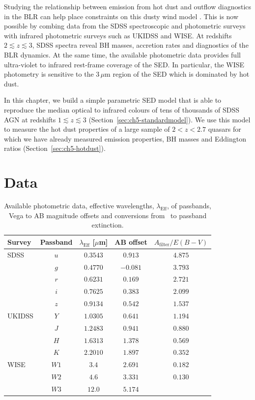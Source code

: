 Studying the relationship between emission from hot dust and outflow diagnostics in the BLR can help place constraints on this dusty wind model \citep[e.g.][]{wang13}. 
This is now possible by combing data from the SDSS spectroscopic and photometric surveys with infrared photometric surveys such as UKIDSS and WISE. 
At redshifts $2\lesssim z \lesssim3$, SDSS spectra reveal BH masses, accretion rates and diagnostics of the BLR dynamics. 
At the same time, the available photometric data provides full ultra-violet to infrared rest-frame coverage of the SED.
In particular, the WISE photometry is sensitive to the $3$\,$\mu$m region of the SED which is dominated by hot dust. 

In this chapter, we build a simple parametric SED model that is able to reproduce the median optical to infrared colours of tens of thousands of SDSS AGN at redshifts $1 \lesssim z \lesssim 3$ (Section~\ref{sec:ch5-standardmodel}).
We use this model to measure the hot dust properties of a large sample of $2 < z < 2.7$ quasars for which we have already measured  emission properties, BH masses and Eddington ratios (Section~\ref{sec:ch5-hotdust}).

\section{Data}

\begin{table}
  \footnotesize
  \centering
  \begin{tabular}{lcccc}
    \hline 
    Survey & Passband & $\lambda_{\text{Eff}}$ [$\mu$m] & AB offset & $A_{\text{filter}}/E(B-V)$ \\
    \hline 
    SDSS & $u$ & $0.3543$ & $ 0.913$ & $4.875$ \\
         & $g$ & $0.4770$ & $-0.081$ & $3.793$ \\
         & $r$ & $0.6231$ & $ 0.169$ & $2.721$ \\
         & $i$ & $0.7625$ & $ 0.383$ & $2.099$ \\
         & $z$ & $0.9134$ & $ 0.542$ & $1.537$ \\
    UKIDSS & $Y$ & $1.0305$ &  $0.641$ & $1.194$ \\
           & $J$ & $1.2483$ &  $0.941$ & $0.880$ \\
           & $H$ & $1.6313$ &  $1.378$ & $0.569$ \\
           & $K$ & $2.2010$ &  $1.897$ & $0.352$ \\
    WISE & $W1$ & $3.4$ & $2.691$ & $0.182$\\
         & $W2$ & $4.6$ & $3.331$ & $0.130$\\
         & $W3$ & $12.0$ & $5.174$ & \\           
    \hline
  \end{tabular}
  \caption[{Available photometric data, effective wavelengths of passbands, Vega to AB magnitude offsets and conversions from \ebv\, to passband extinction.}]{Available photometric data, effective wavelengths, $\lambda_{\text{Eff}}$, of passbands, Vega to AB magnitude offsets and conversions from \ebv\, to passband extinction.}
  \label{tab:photometry}
\end{table}

